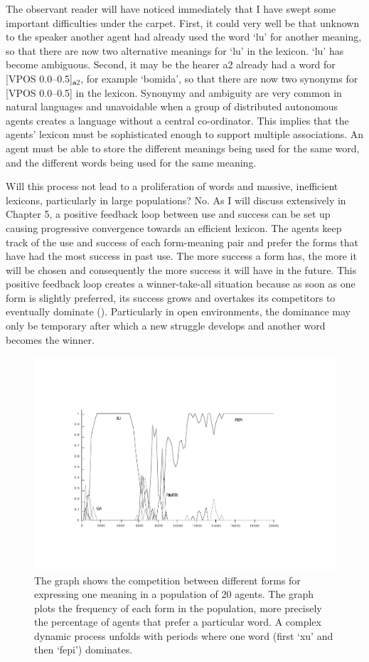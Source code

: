 The observant reader will have noticed immediately that 
I have swept some important difficulties under the carpet. 
First, it could very well be that unknown to the speaker 
another agent had already used the word `lu' 
for another meaning, so that there are now 
two alternative meanings for `lu' in the lexicon. `lu' 
has become ambiguous. Second, it may be the hearer {\bfshape a2} already 
had a word for [VPOS 0.0--0.5]$_{\mathbf  a2}$, for example `bomida', 
so that there are now two synonyms for [VPOS 0.0--0.5] in the lexicon. 
Synonymy and ambiguity are very common in 
natural languages and unavoidable when a group of 
distributed autonomous agents creates a language without
a central co-ordinator. This implies that 
the agents' lexicon must be sophisticated enough 
to support multiple associations. An agent must be able to 
store the different meanings being used for the same word, and the 
different words being used for the same meaning. 

Will this process not lead to a proliferation of words and 
massive, inefficient lexicons, particularly in large
populations? No. As I will discuss extensively 
in Chapter 5, a positive feedback 
loop between use and success
can be set up causing progressive convergence towards an 
efficient lexicon. The agents keep track of the use and 
success of each form-meaning pair and prefer the forms that have had
the most success in past use. The more success a form has, the more
it will be chosen 
and consequently the more success it will have in the 
future. This positive feedback loop creates a winner-take-all 
situation because as soon as one form is slightly preferred, 
its success grows and overtakes its competitors
to eventually dominate (). Particularly 
in open environments, the dominance may only be temporary 
after which a new struggle develops and another word 
becomes the winner. 

\begin{figure}[htbp]
  \centerline{\includegraphics[width=.80\textwidth]{chap2/figs/competition-1}}
\caption{\label{competition1} 
The graph shows the competition between different forms for
expressing one meaning in a population of 20 agents. The graph plots 
the frequency of each form in the population, more precisely the percentage
of agents that prefer a particular word. A complex dynamic
process unfolds with periods where one word (first `xu' and then `fepi') dominates.} 
\end{figure}

